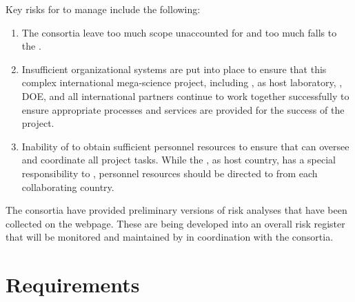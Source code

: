 Key risks for  to manage include the following:
\begin{enumerate}
\item The consortia leave too much scope unaccounted for and too much falls
  to  the .
\item Insufficient organizational systems are put into place to
  ensure that this complex international mega-science project,
  including , \fnal as host laboratory, \surf, DOE, and all international
  partners continue to work together successfully to ensure
  appropriate processes and services are provided for the success of
  the project.
\item Inability of  to obtain sufficient personnel resources to
  ensure that  can oversee and coordinate all project tasks.  While the , 
  as host country, has a special responsibility to , personnel resources should
  be directed to  from each collaborating country. 
\end{enumerate}

The consortia have provided preliminary versions of risk analyses that
have been collected on the  webpage. These are being developed into
an overall risk register that will be monitored and maintained by 
in coordination with the consortia.

\section{Requirements}
\label{sec:fdsp-coord-requirements}

